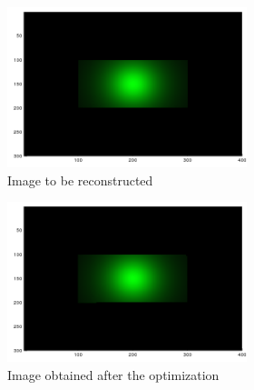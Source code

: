 \documentclass{juliacon}
\begin{document}
\begin{figure}[!htb]
\begin{subfigure}[c]{0.45\textwidth}
\begin{subfigure}[c]{0.45\textwidth}
            \centering          
            \includegraphics[width=\textwidth]{images/camera/target_image.png}
            \caption{Image to be reconstructed}
            \label{fig:cam_target}
        \end{subfigure}
        \centering
        \hfill
        \begin{subfigure}[c]{0.45\textwidth}
            \centering
            \includegraphics[width=\textwidth]{images/camera/recon.png}
            \caption{Image obtained after the optimization}
        \end{subfigure}
        \hfill
        \begin{subfigure}[c]{0.45\textwidth}
            \centering

\end{subfigure}
\end{subfigure}
\end{figure}
\end{document}
